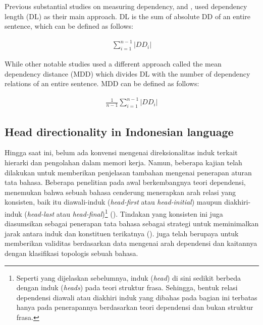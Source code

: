 \documentclass[10pt, a4paper, conference, compsocconf]{IEEEtran}
\begin{document}
Previous substantial studies on measuring dependency, \cite{gildea2010grammars} and \cite{futrell2015large}, used dependency length (DL) as their main approach. DL is the sum of absolute DD of an entire sentence, which can be defined as follows:

\begin{align}\label{eq:bola}
	\displaystyle\sum_{i=1}^{n-1} |DD_i|
\end{align}

While other notable studies used a different approach called the mean dependency distance (MDD) \citep{liu2008dependency, liu2017dependency} which divides DL with the number of dependency relations of an entire sentence. MDD can be defined as follows:

\begin{align}\label{eq:bola}
	\frac{1}{n-1} \displaystyle\sum_{i=1}^{n-1} |DD_i|
\end{align}



\subsection{Head directionality in Indonesian language}


Hingga saat ini, belum ada konvensi mengenai direksionalitas induk terkait hierarki dan pengolahan dalam memori kerja. Namun, beberapa kajian telah dilakukan untuk memberikan penjelasan tambahan mengenai penerapan aturan tata bahasa. Beberapa penelitian pada awal berkembangnya teori dependensi, menemukan bahwa sebuah bahasa cenderung menerapkan arah relasi yang konsisten, baik itu \gls{diawali-induk} (\textit{head-first} atau \textit{head-initial}) maupun \gls{diakhiri-induk} (\textit{head-last} atau \textit{head-final})\footnote{Seperti yang dijelaskan sebelumnya, induk (\textit{head}) di sini sedikit berbeda dengan induk (\textit{heads}) pada teori struktur frasa. Sehingga, bentuk relasi dependensi diawali atau diakhiri induk yang dibahas pada bagian ini terbatas hanya pada penerapannya berdasarkan teori dependensi dan bukan struktur frasa.} (\citealp{hawkins1994performance, radford1997syntactic, vennemann1994linguistic}). Tindakan yang konsisten ini juga diasumsikan sebagai penerapan tata bahasa sebagai strategi untuk meminimalkan jarak antara induk dan konstituen terikatnya (\citealp{hawkins1994performance, frazier1985syntactic}). \cite{liu2010dependency} juga telah berupaya untuk memberikan validitas berdasarkan data mengenai arah dependensi dan kaitannya dengan klasifikasi topologis sebuah bahasa.
\end{document}
